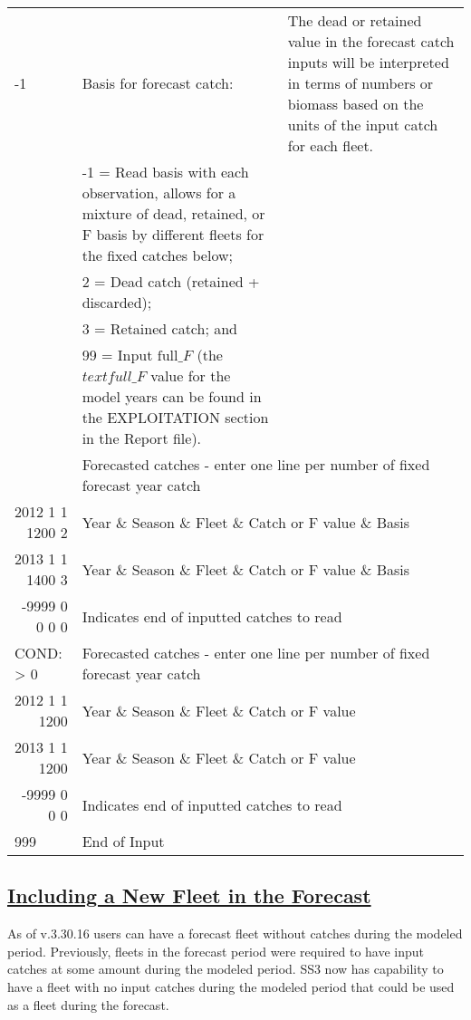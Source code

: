 \begin{landscape}
{\begin{longtable}{p{2cm} p{7cm} p{12cm}}
  \hline
  -1 & Basis for forecast catch: & \multirow{1}{1cm}[-0.25cm]{\parbox{12cm}{The dead or retained value in the forecast catch inputs will be interpreted in terms of numbers or biomass based on the units of the input catch for each fleet.}} \Tstrut\\
    & -1 = Read basis with each observation, allows for a mixture of dead, retained, or F basis by different fleets for the fixed catches below; & \\
    & 2 = Dead catch (retained + discarded); & \\
    & 3 = Retained catch; and & \\
    & 99 = Input $\text{full\_}F$ (the $text{full\_}F$ value for the model years can be found in the EXPLOITATION section in the Report file). & \Bstrut\\
  
  \pagebreak
  \multicolumn{1}{l}{COND: == -1} & \multicolumn{2}{l}{Forecasted catches - enter one line per number of fixed forecast year catch} \Tstrut\\
  \multicolumn{1}{r}{2012 1 1 1200 2} & \multicolumn{2}{l}{Year \& Season \& Fleet \& Catch or F value \& Basis} \\
  \multicolumn{1}{r}{2013 1 1 1400 3} & \multicolumn{2}{l}{Year \& Season \& Fleet \& Catch or F value \& Basis} \\
  \multicolumn{1}{r}{-9999 0 0 0 0} & \multicolumn{2}{l}{Indicates end of inputted catches to read} \Bstrut\\

  \multicolumn{1}{l}{COND: > 0} & \multicolumn{2}{l}{Forecasted catches - enter one line per number of fixed forecast year catch} \Tstrut\\
  \multicolumn{1}{r}{2012 1 1 1200} & \multicolumn{2}{l}{Year \& Season \& Fleet \& Catch or F value} \\
  \multicolumn{1}{r}{2013 1 1 1200} & \multicolumn{2}{l}{Year \& Season \& Fleet \& Catch or F value} \\
  \multicolumn{1}{r}{-9999 0 0 0} & \multicolumn{2}{l}{Indicates end of inputted catches to read} \Bstrut\\

  \hline
  999 & End of Input & \Bstrut\\

  \end{longtable}}
\end{landscape}

\hypertarget{NewFleetForecast}{}
\subsection[Including a New Fleet in the Forecast]{\protect\hyperlink{NewFleetForecast}{Including a New Fleet in the Forecast}}
As of v.3.30.16 users can have a forecast fleet without catches during the modeled period. Previously, fleets in the forecast period were required to have input catches at some amount during the modeled period. SS3 now has capability to have a fleet with no input catches during the modeled period that could be used as a fleet during the forecast.

